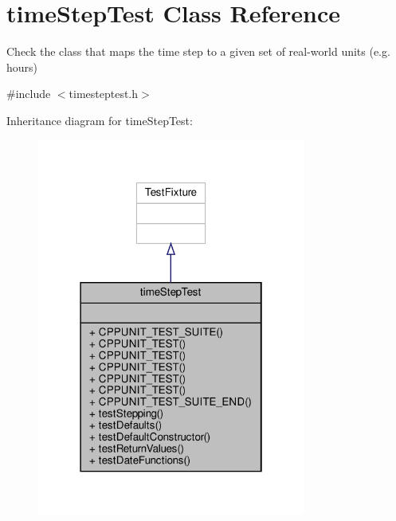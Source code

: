 \hypertarget{classtimeStepTest}{}\section{time\+Step\+Test Class Reference}
\label{classtimeStepTest}


Check the class that maps the time step to a given set of real-\/world units (e.\+g. hours)  




{\ttfamily \#include $<$timesteptest.\+h$>$}



Inheritance diagram for time\+Step\+Test\+:
\nopagebreak
\begin{figure}[H]
\begin{center}
\leavevmode
\includegraphics[width=250pt]{classtimeStepTest__inherit__graph}
\end{center}
\end{figure}


